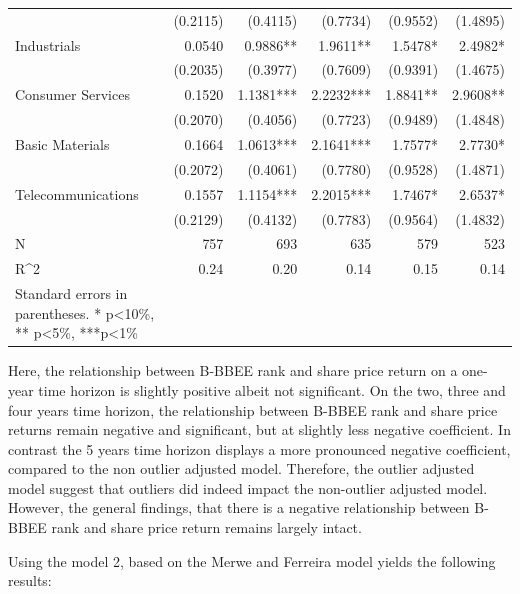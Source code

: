 \begin{table}[H]
{\begin{tabular}{lrrrrr}
                   & (0.2115)  & (0.4115)  & (0.7734)  & (0.9552)  & (1.4895)  \\
Industrials        & 0.0540    & 0.9886**  & 1.9611**  & 1.5478*   & 2.4982*   \\
                   & (0.2035)  & (0.3977)  & (0.7609)  & (0.9391)  & (1.4675)  \\
Consumer Services  & 0.1520    & 1.1381*** & 2.2232*** & 1.8841**  & 2.9608**  \\
                   & (0.2070)  & (0.4056)  & (0.7723)  & (0.9489)  & (1.4848)  \\
Basic Materials    & 0.1664    & 1.0613*** & 2.1641*** & 1.7577*   & 2.7730*   \\
                   & (0.2072)  & (0.4061)  & (0.7780)  & (0.9528)  & (1.4871)  \\
Telecommunications & 0.1557    & 1.1154*** & 2.2015*** & 1.7467*   & 2.6537*   \\
                   & (0.2129)  & (0.4132)  & (0.7783)  & (0.9564)  & (1.4832)  \\
N                  & 757       & 693       & 635       & 579       & 523       \\
R^2                 & 0.24      & 0.20      & 0.14      & 0.15      & 0.14      \\
   \bottomrule
Standard errors in parentheses.
* p<10\%, ** p<5\%, ***p<1\%
\end{tabular}}
\end{table} 

Here, the relationship between B-BBEE rank and share price return on a one-year time horizon is slightly positive albeit not significant. On the two, three and four years time horizon, the relationship between B-BBEE rank and share price returns remain negative and significant, but at slightly less negative coefficient. In contrast the 5 years time horizon displays a more pronounced negative coefficient, compared to the non outlier adjusted model. Therefore, the outlier adjusted model suggest that outliers did indeed impact the non-outlier adjusted model. However, the general findings, that there is a negative relationship between B-BBEE rank and share price return remains largely intact.

Using the model 2, based on the Merwe and Ferreira model yields the following results:

